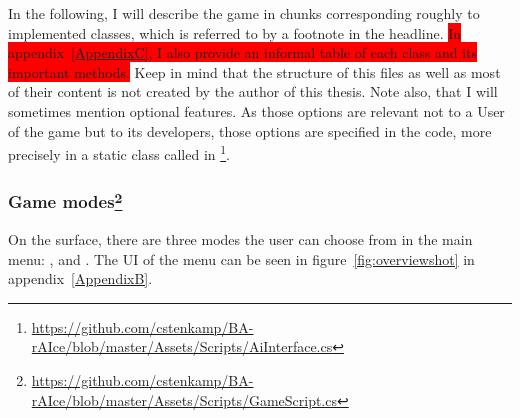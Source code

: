 In the following, I will describe the game in chunks corresponding roughly to implemented classes, which is referred to by a footnote in the headline. \colorbox{red}{In appendix~\ref{AppendixC}, I also provide an informal table of each class and its important methods.} Keep in mind that the structure of this files as well as most of their content is not created by the author of this thesis. Note also, that I will sometimes mention optional features. As those options are relevant not to a User of the game but to its developers, those options are specified in the code, more precisely in a static class called  in \footnote{\label{aiint} \url{https://github.com/cstenkamp/BA-rAIce/blob/master/Assets/Scripts/AiInterface.cs}}.



\subsubsection{Game modes\footnote{\label{gamescript}\url{https://github.com/cstenkamp/BA-rAIce/blob/master/Assets/Scripts/GameScript.cs}}}

On the surface, there are three modes the user can choose from in the main menu: ,  and . The UI of the menu can be seen in figure~\ref{fig:overviewshot} in appendix~\ref{AppendixB}. 

